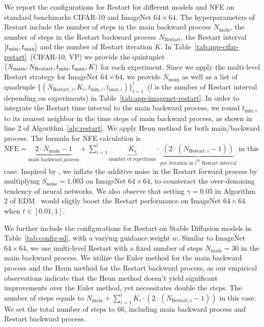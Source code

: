 We report the configurations for Restart for different models and NFE on standard benchmarks CIFAR-10 and ImageNet $64\times 64$. The hyperparameters of Restart include the number of steps in the main backward process $N_{\textrm{main}}$, the number of steps in the Restart backward process $N_{\textrm{Restart}}$, the Restart interval $[t_{\textrm{min}}, t_{\textrm{max}}]$ and the number of Restart iteration $K$. In Table~\ref{tab:app-cifar-restart}~(CIFAR-10, VP) we provide the quintuplet $(N_{\textrm{main}}, N_{\textrm{Restart}}, t_{\textrm{min}}, t_{\textrm{max}}, K)$ for each experiment. Since we apply the multi-level Restart strategy for ImageNet $64\times 64$, we provide $N_{\textrm{main}}$ as well as a list of quadruple $\{(N_{\textrm{Restart}, i}, K_i, t_{\textrm{min}, i}, t_{\textrm{max}, i})\}_{i=1}^l$~($l$ is the number of Restart interval depending on experiments) in Table~\ref{tab:app-imagenet-restart}. In order to integrate the Restart time interval to the main backward process, we round $t_{\textrm{min}, i}$ to its nearest neighbor in the time steps of main backward process, as shown in line 2 of Algorithm~\ref{alg:restart}. We apply Heun method for both main/backward process. The formula for NFE calculation is $\textrm{NFE}=\underbrace{2\cdot N_{\textrm{main}} -1}_{\textrm{main backward process}} + \sum_{i=1}^l\underbrace{K_i}_{\textrm{number of repetitions}}\cdot \underbrace{(2 \cdot (N_{\textrm{Restart}, i}-1))}_{\textrm{per iteration in }i^{\textrm{th}}\textrm{ Restart interval}}$ in this case. Inspired by \cite{Karras2022ElucidatingTD}, we inflate the additive noise in the Restart forward process by multiplying $S_{\textrm{noise}}=1.003$ on ImageNet $64\times 64$, to counteract the over-denoising tendency of neural networks. We also observe that setting $\gamma=0.05$ in Algorithm 2 of EDM~\cite{Karras2022ElucidatingTD} would sligtly boost the Restart performance on ImageNet $64\times 64$ when $t \in [0.01,1]$. 

We further include the configurations for Restart on Stable Diffusion models in Table~\ref{tab:config-sd}, with a varying guidance weight $w$. Similar to ImageNet $64\times 64$, we use multi-level Restart with a fixed number of steps $N_{\textrm{main}}=30$ in the main backward process. We utilize the Euler method for the main backward process and the Heun method for the Restart backward process, as our empirical observations indicate that the Heun method doesn't yield significant improvements over the Euler method, yet necessitates double the steps. The number of steps equals to $N_{\textrm{main}} + \sum_{i=1}^lK_i\cdot (2 \cdot (N_{\textrm{Restart}, i}-1))$ in this case. We set the total number of steps to $66$, including main backward process and Restart backward process.

